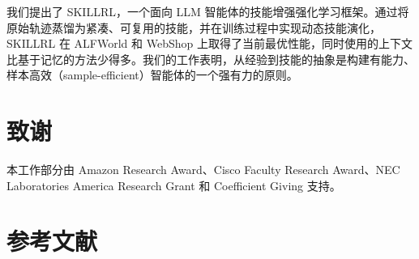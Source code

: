 \documentclass[11pt,UTF8,fontset=fandol]{ctexart}
\begin{document}
我们提出了 SKILLRL，一个面向 LLM 智能体的技能增强强化学习框架。通过将原始轨迹蒸馏为紧凑、可复用的技能，并在训练过程中实现动态技能演化，SKILLRL 在 ALFWorld 和 WebShop 上取得了当前最优性能，同时使用的上下文比基于记忆的方法少得多。我们的工作表明，从经验到技能的抽象是构建有能力、样本高效（sample-efficient）智能体的一个强有力的原则。

\section*{致谢}

本工作部分由 Amazon Research Award、Cisco Faculty Research Award、NEC Laboratories America Research Grant 和 Coefficient Giving 支持。

\section*{参考文献}
\small
\end{document}
